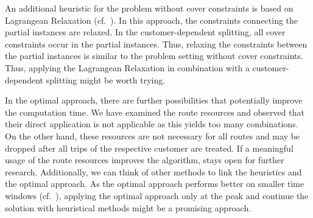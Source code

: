An additional heuristic for the problem without cover constraints is based on Lagrangean Relaxation (cf.~\cite[Cap.~9]{Knoll}). In this approach, the constraints connecting the partial instances are relaxed. In the customer-dependent splitting, all cover constraints occur in the partial instances. Thus, relaxing the constraints between the partial instances is similar to the problem setting without cover constraints. Thus, applying the Lagrangean Relaxation in combination with a customer-dependent splitting might be worth trying.

In the optimal approach, there are further possibilities that potentially improve the computation time. We have examined the route resources and observed that their direct application is not applicable as this yields too many combinations. On the other hand, these resources are not necessary for all routes and may be dropped after all trips of the respective customer are treated. If a meaningful usage of the route resources improves the algorithm, stays open for further research. Additionally, we can think of other methods to link the heuristics and the optimal approach. As the optimal approach performs better on smaller time windows (cf.~\cite[Sec.~10.2]{Kaiser}), applying the optimal approach only at the peak and continue the solution with heuristical methods might be a promising approach.